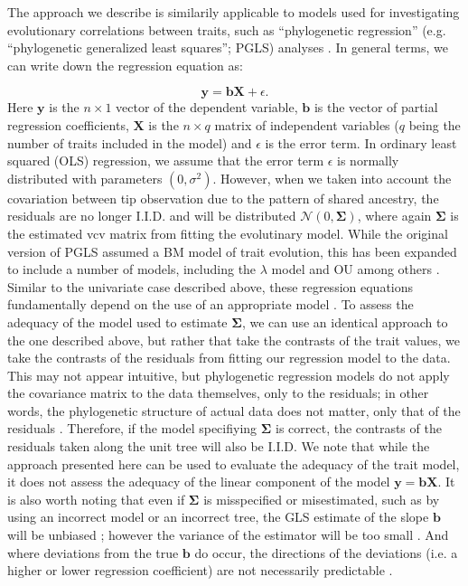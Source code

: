 \documentclass[a4paper,12pt]{article}
\begin{document}

The approach we describe is similarily applicable to models used for investigating evolutionary correlations between traits, such as ``phylogenetic regression'' (e.g. ``phylogenetic generalized least squares''; PGLS) analyses \citep{Grafen1989, Rohlf2001}. In general terms, we can write down the regression equation as:

\begin{equation}
\mathbf{y} = \mathbf{b}\mathbf{X} + \epsilon .
\end{equation}
Here $\mathbf{y}$ is the $n \times 1$ vector of the dependent variable, $\mathbf{b}$ is the vector of partial regression coefficients, $\mathbf{X}$ is the $n \times q$ matrix of independent variables ($q$ being the number of traits included in the model) and $\epsilon$ is the error term. In ordinary least squared (OLS) regression, we assume that the error term $\epsilon$ is normally distributed with parameters $(0, \sigma^2)$. However, when we taken into account the covariation between tip observation due to the pattern of shared ancestry, the residuals are no longer I.I.D. and will be distributed $\mathcal{N} (0, \mathbf{\Sigma})$, where again $\mathbf{\Sigma}$ is the estimated vcv matrix from fitting the evolutinary model. While the original version of PGLS assumed a BM model of trait evolution, this has been expanded to include a number of models, including the $\lambda$ model \citep{Pagel1997, Revell2010, Freckleton2011} and OU \citep[e.g.][]{Hansen2008} among others \citep[see also][]{Lynch1991, Hadfield2010}. Similar to the univariate case described above, these regression equations fundamentally depend on the use of an appropriate model \citep{Hansen2012}. To assess the adequacy of the model used to estimate $\mathbf{\Sigma}$, we can use an identical approach to the one described above, but rather that take the contrasts of the trait values, we take the contrasts of the residuals from fitting our regression model to the data. This may not appear intuitive, but phylogenetic regression models do not apply the covariance matrix to the data themselves, only to the residuals; in other words, the phylogenetic structure of actual data does not matter, only that of the residuals \citep{Rohlf2001, Revell2010}. Therefore, if the model specifiying $\mathbf{\Sigma}$ is correct, the contrasts of the residuals taken along the unit tree will also be I.I.D. We note that while the approach presented here can be used to evaluate the adequacy of the trait model, it does not assess the adequacy of the linear component of the model $\mathbf{y} = \mathbf{b}\mathbf{X}$. It is also worth noting that even if $\mathbf{\Sigma}$ is misspecified or misestimated, such as by using an incorrect model or an incorrect tree, the GLS estimate of the slope $\mathbf{b}$ will be unbiased \citep{Rao1999}; however the variance of the estimator will be too small \citep{Rohlf2006}. And where deviations from the true $\mathbf{b}$ do occur, the directions of the deviations (i.e. a higher or lower regression coefficient) are not necessarily predictable \citep{Rohlf2006}.
\end{document}
